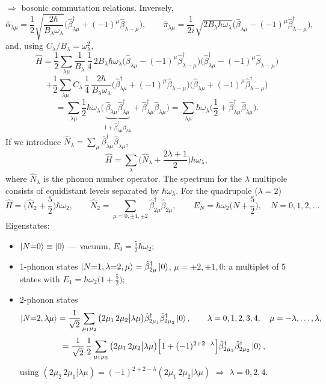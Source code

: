 \documentclass[11pt,a4paper]{article}
\newcommand{\op}[1]{\hat{#1}}
\begin{document}
$\Rightarrow$ bosonic commutation relations. Inversely,
\[
\op\alpha_{\lambda\mu}=\frac12\sqrt{\frac{2\hbar}{B_\lambda\omega_\lambda}}\Big(\op\beta^\dagger_{\lambda\mu}+(-1)^\mu\op\beta_{\lambda-\mu}\Big),
\qquad
\op\pi_{\lambda\mu}=\frac{1}{2i}\sqrt{2B_\lambda\hbar\omega_\lambda}\Big(\op\beta_{\lambda\mu}-(-1)^\mu\op\beta^\dagger_{\lambda-\mu}\Big),
\]
and, using $C_\lambda/B_\lambda=\omega_\lambda^2$,
\[
\op H=\frac12\sum_{\lambda\mu}\frac{1}{B_\lambda}\,\frac14\,2B_\lambda\hbar\omega_\lambda\Big(\op\beta_{\lambda\mu}-(-1)^\mu\op\beta^\dagger_{\lambda-\mu}\Big)\Big(\op\beta^\dagger_{\lambda\mu}-(-1)^\mu\op\beta_{\lambda-\mu}\Big)
\]
\[
+\frac12\sum_{\lambda\mu}C_\lambda\,\frac14\,\frac{2\hbar}{B_\lambda\omega_\lambda}\Big(\op\beta^\dagger_{\lambda\mu}+(-1)^\mu\op\beta_{\lambda-\mu}\Big)\Big(\op\beta_{\lambda\mu}+(-1)^\mu\op\beta^\dagger_{\lambda-\mu}\Big)
\]
\[
=\sum_{\lambda\mu}\frac12\hbar\omega_\lambda\Big(\underbrace{\op\beta_{\lambda\mu}\op\beta^\dagger_{\lambda\mu}}_{1+\op\beta^\dagger_{\lambda\mu}\op\beta_{\lambda\mu}}+\op\beta^\dagger_{\lambda\mu}\op\beta_{\lambda\mu}\Big)
=\sum_{\lambda\mu}\hbar\omega_\lambda\Big(\frac12+\op\beta^\dagger_{\lambda\mu}\op\beta_{\lambda\mu}\Big).
\]
If we introduce $\op N_\lambda=\sum_\mu\op\beta^\dagger_{\lambda\mu}\op\beta_{\lambda\mu}$,
\[
\op H=\sum_\lambda\Big(\op N_\lambda+\frac{2\lambda+1}{2}\Big)\hbar\omega_\lambda ,
\]
where $\op N_\lambda$ is the phonon number operator. The spectrum for the $\lambda$ multipole consists of equidistant levels separated by $\hbar\omega_\lambda$. For the quadrupole ($\lambda=2$)
\[
\op H=\Big(\op N_2+\frac52\Big)\hbar\omega_2,\qquad \op N_2=\sum_{\mu=0,\pm1,\pm2}\op\beta^\dagger_{2\mu}\op\beta_{2\mu},
\qquad E_N=\hbar\omega_2\Big(N+\frac52\Big),\quad N=0,1,2,\dots
\]
Eigenstates:
\begin{itemize}
\item $\ket{N{=}0}\equiv\ket0$ --- vacuum, $E_0=\frac52\hbar\omega_2$;
\item 1-phonon states $\ket{N{=}1,\lambda{=}2,\mu}=\op\beta^\dagger_{2\mu}\ket0$, $\mu=\pm2,\pm1,0$: a multiplet of 5 states with $E_1=\hbar\omega_2\big(1+\frac52\big)$;
\item 2-phonon states
\[
\ket{N{=}2,\lambda\mu}=\frac{1}{\sqrt2}\sum_{\mu_1\mu_2}\big(2\mu_1\,2\mu_2\big|\lambda\mu\big)\op\beta^\dagger_{2\mu_1}\op\beta^\dagger_{2\mu_2}\ket0,
\qquad \lambda=0,1,2,3,4,\quad \mu=-\lambda,\dots,\lambda,
\]
\[
=\frac{1}{\sqrt2}\,\frac12\sum_{\mu_1\mu_2}\big(2\mu_1\,2\mu_2\big|\lambda\mu\big)\Big[1+(-1)^{2+2-\lambda}\Big]\op\beta^\dagger_{2\mu_1}\op\beta^\dagger_{2\mu_2}\ket0,
\]
using $(2\mu_2\,2\mu_1|\lambda\mu)=(-1)^{2+2-\lambda}(2\mu_1\,2\mu_2|\lambda\mu)$ $\Rightarrow$ $\lambda=0,2,4$.
\end{itemize}
\end{document}
